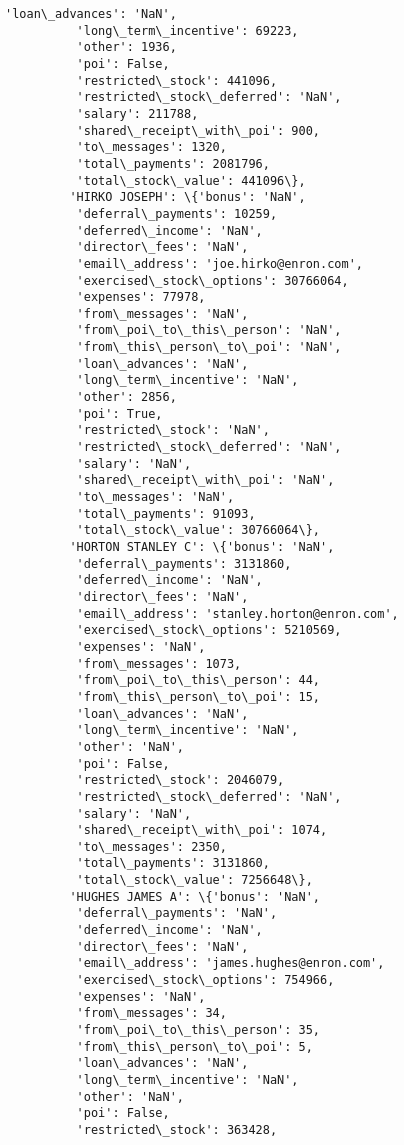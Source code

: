 \documentclass[11pt]{article}
\begin{document}
\begin{Verbatim}[commandchars=\\\{\}]
          'loan\_advances': 'NaN',
          'long\_term\_incentive': 69223,
          'other': 1936,
          'poi': False,
          'restricted\_stock': 441096,
          'restricted\_stock\_deferred': 'NaN',
          'salary': 211788,
          'shared\_receipt\_with\_poi': 900,
          'to\_messages': 1320,
          'total\_payments': 2081796,
          'total\_stock\_value': 441096\},
         'HIRKO JOSEPH': \{'bonus': 'NaN',
          'deferral\_payments': 10259,
          'deferred\_income': 'NaN',
          'director\_fees': 'NaN',
          'email\_address': 'joe.hirko@enron.com',
          'exercised\_stock\_options': 30766064,
          'expenses': 77978,
          'from\_messages': 'NaN',
          'from\_poi\_to\_this\_person': 'NaN',
          'from\_this\_person\_to\_poi': 'NaN',
          'loan\_advances': 'NaN',
          'long\_term\_incentive': 'NaN',
          'other': 2856,
          'poi': True,
          'restricted\_stock': 'NaN',
          'restricted\_stock\_deferred': 'NaN',
          'salary': 'NaN',
          'shared\_receipt\_with\_poi': 'NaN',
          'to\_messages': 'NaN',
          'total\_payments': 91093,
          'total\_stock\_value': 30766064\},
         'HORTON STANLEY C': \{'bonus': 'NaN',
          'deferral\_payments': 3131860,
          'deferred\_income': 'NaN',
          'director\_fees': 'NaN',
          'email\_address': 'stanley.horton@enron.com',
          'exercised\_stock\_options': 5210569,
          'expenses': 'NaN',
          'from\_messages': 1073,
          'from\_poi\_to\_this\_person': 44,
          'from\_this\_person\_to\_poi': 15,
          'loan\_advances': 'NaN',
          'long\_term\_incentive': 'NaN',
          'other': 'NaN',
          'poi': False,
          'restricted\_stock': 2046079,
          'restricted\_stock\_deferred': 'NaN',
          'salary': 'NaN',
          'shared\_receipt\_with\_poi': 1074,
          'to\_messages': 2350,
          'total\_payments': 3131860,
          'total\_stock\_value': 7256648\},
         'HUGHES JAMES A': \{'bonus': 'NaN',
          'deferral\_payments': 'NaN',
          'deferred\_income': 'NaN',
          'director\_fees': 'NaN',
          'email\_address': 'james.hughes@enron.com',
          'exercised\_stock\_options': 754966,
          'expenses': 'NaN',
          'from\_messages': 34,
          'from\_poi\_to\_this\_person': 35,
          'from\_this\_person\_to\_poi': 5,
          'loan\_advances': 'NaN',
          'long\_term\_incentive': 'NaN',
          'other': 'NaN',
          'poi': False,
          'restricted\_stock': 363428,

\end{Verbatim}
\end{document}
